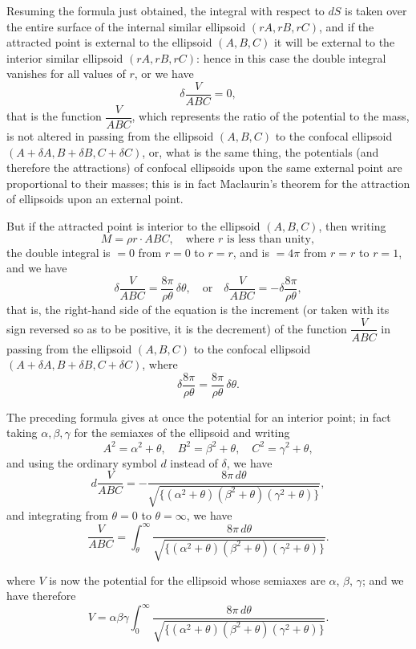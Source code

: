 \documentclass[12pt,a4paper]{article}
\theoremstyle{definition}
\begin{document}
Resuming the formula just obtained, the integral with respect to $dS$ is taken
over the entire surface of the internal similar ellipsoid $(rA, rB, rC)$, and if the
attracted point is external to the ellipsoid $(A, B, C)$ it will be external to the
interior similar ellipsoid $(rA, rB, rC)$: hence in this case the double integral vanishes
for all values of $r$, or we have
\[
\delta\frac{V}{ABC} = 0,
\]
that is the function $\dfrac{V}{ABC}$, which represents the ratio of the potential to the mass,
is not altered in passing from the ellipsoid $(A, B, C)$ to the confocal ellipsoid
$(A + \delta A, B + \delta B, C + \delta C)$, or, what is the same thing, the potentials (and therefore
the attractions) of confocal ellipsoids upon the same external point are proportional
to their masses; this is in fact Maclaurin's theorem for the attraction of ellipsoids
upon an external point.

But if the attracted point is interior to the ellipsoid $(A, B, C)$, then writing
\[
M = \rho r \cdot ABC, \quad \text{where } r \text{ is less than unity},
\]
the double integral is $=0$ from $r=0$ to $r=r$, and is $=4\pi$ from $r=r$ to $r=1$,
and we have
\[
\delta\frac{V}{ABC} = \frac{8\pi}{\rho\theta}\,\delta\theta,
\quad\text{or}\quad
\delta\frac{V}{ABC} = -\delta\frac{8\pi}{\rho\theta},
\]
that is, the right-hand side of the equation is the increment (or taken with its sign
reversed so as to be positive, it is the decrement) of the function $\dfrac{V}{ABC}$ in passing
from the ellipsoid $(A, B, C)$ to the confocal ellipsoid $(A+\delta A, B+\delta B, C+\delta C)$,
where
\[
\delta\frac{8\pi}{\rho\theta} = \frac{8\pi}{\rho\theta}\,\delta\theta.
\]

The preceding formula gives at once the potential for an interior point; in fact
taking $\alpha, \beta, \gamma$ for the semiaxes of the ellipsoid and writing
\[
A^2 = \alpha^2 + \theta, \quad B^2 = \beta^2 + \theta, \quad C^2 = \gamma^2 + \theta,
\]
and using the ordinary symbol $d$ instead of $\delta$, we have
\[
d\frac{V}{ABC} = -\frac{8\pi\,d\theta}{\sqrt{\{(
\alpha^2+\theta)(\beta^2+\theta)(\gamma^2+\theta)\}}},
\]
and integrating from $\theta=0$ to $\theta=\infty$, we have
\[
\frac{V}{ABC} = \int_\theta^\infty \frac{8\pi\,d\theta}{\sqrt{\{(
\alpha^2+\theta)(\beta^2+\theta)(\gamma^2+\theta)\}}}.
\]

\noindent
where $V$ is now the potential for the ellipsoid whose semiaxes are $\alpha$, $\beta$, $\gamma$; and we
have therefore
\[
V = \alpha\beta\gamma \int_0^\infty \frac{8\pi\,d\theta}{\sqrt{\{(
\alpha^2+\theta)(\beta^2+\theta)(\gamma^2+\theta)\}}}.
\]
\end{document}

